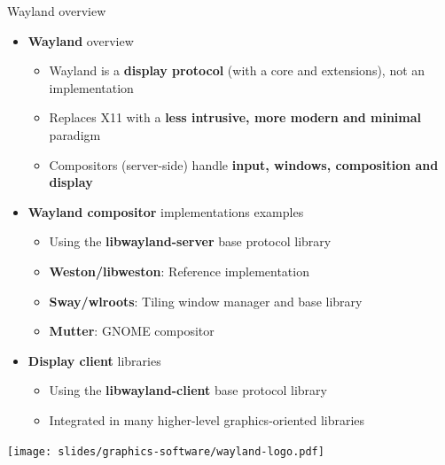 \begin{frame}{Wayland overview}
  \begin{itemize}
  \item \textbf{Wayland} overview
    \begin{itemize}
    \item Wayland is a \textbf{display protocol} (with a core and extensions), not an implementation
    \item Replaces X11 with a \textbf{less intrusive, more modern and minimal} paradigm
    \item Compositors (server-side) handle \textbf{input, windows, composition and display}
    \end{itemize}
  \end{itemize}
  \begin{minipage}[b]{0.8\textwidth}
  \begin{itemize}
  \item \textbf{Wayland compositor} implementations examples
    \begin{itemize}
    \item Using the \textbf{libwayland-server} base protocol library
    \item \textbf{Weston/libweston}: Reference implementation
    \item \textbf{Sway/wlroots}: Tiling window manager and base library
    \item \textbf{Mutter}: GNOME compositor
    \end{itemize}
  \item \textbf{Display client} libraries
    \begin{itemize}
    \item Using the \textbf{libwayland-client} base protocol library
    \item Integrated in many higher-level graphics-oriented libraries
    \end{itemize}
  \end{itemize}
  \end{minipage}
  \begin{minipage}[b]{0.15\textwidth}
  \texttt{[image: slides/graphics-software/wayland-logo.pdf]}
  \end{minipage}
\end{frame}

